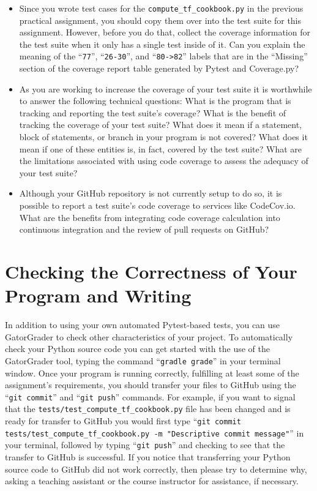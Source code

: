 \documentclass[11pt]{article}
\newcommand{\mainprogram}{\lstinline{compute_tf_cookbook.py}}
\newcommand{\testprogramsource}{\lstinline{tests/test_compute_tf_cookbook.py}}
\newcommand{\gatorgraderstart}{\command{gradle grade}}
\newcommand{\gitcommit}{\command{git commit}}
\newcommand{\gitpush}{\command{git push}}
\newcommand{\gitcommittestprogram}{\command{git commit tests/test_compute_tf_cookbook.py -m "Descriptive commit message"}}
\newcommand{\command}[1]{``\lstinline{#1}''}
\begin{document}
\begin{itemize}

  \setlength{\itemsep}{0pt}

  \item Since you wrote test cases for the \mainprogram{} in the previous
    practical assignment, you should copy them over into the test suite for this
    assignment. However, before you do that, collect the coverage information
    for the test suite when it only has a single test inside of it. Can you
    explain the meaning of the \command{77}, \command{26-30}, and
    \command{80->82} labels that are in the ``Missing'' section of the coverage
    report table generated by Pytest and Coverage.py?

  \item As you are working to increase the coverage of your test suite it is
    worthwhile to answer the following technical questions: What is the program
    that is tracking and reporting the test suite's coverage? What is the
    benefit of tracking the coverage of your test suite? What does it mean if a
    statement, block of statements, or branch in your program is not covered?
    What does it mean if one of these entities is, in fact, covered by the test
    suite? What are the limitations associated with using code coverage to
    assess the adequacy of your test suite?

  \item Although your GitHub repository is not currently setup to do so, it is
    possible to report a test suite's code coverage to services like CodeCov.io.
    What are the benefits from integrating code coverage calculation into
    continuous integration and the review of pull requests on GitHub?

\end{itemize}

\section*{Checking the Correctness of Your Program and Writing}

In addition to using your own automated Pytest-based tests, you can use
GatorGrader to check other characteristics of your project. To automatically
check your Python source code you can get started with the use of the
GatorGrader tool, typing the command \gatorgraderstart{} in your terminal
window.
%
Once your program is running correctly, fulfilling at least some of the
assignment's requirements, you should transfer your files to GitHub using the
\gitcommit{} and \gitpush{} commands. For example, if you want to signal that
the \testprogramsource{} file has been changed and is ready for transfer to
GitHub you would first type \gitcommittestprogram{} in your terminal, followed
by typing \gitpush{} and checking to see that the transfer to GitHub is
successful. If you notice that transferring your Python source code to GitHub
did not work correctly, then please try to determine why, asking a teaching
assistant or the course instructor for assistance, if necessary.
\end{document}
